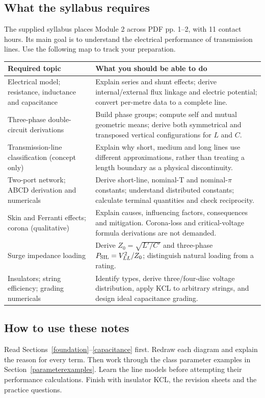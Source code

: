 \documentclass[11pt,a4paper]{article}
\begin{document}
\subsection{What the syllabus requires}
The supplied syllabus places Module 2 across PDF pp. 1--2, with 11 contact hours. Its main goal is to understand the electrical performance of transmission lines. Use the following map to track your preparation.
\begin{center}\small
\begin{tabularx}{\textwidth}{L{5.8cm}Y}
\toprule\textbf{Required topic} & \textbf{What you should be able to do}\\\midrule
Electrical model; resistance, inductance and capacitance & Explain series and shunt effects; derive internal/external flux linkage and electric potential; convert per-metre data to a complete line.\\
Three-phase double-circuit derivations & Build phase groups; compute self and mutual geometric means; derive both symmetrical and transposed vertical configurations for $L$ and $C$.\\
Transmission-line classification (concept only) & Explain why short, medium and long lines use different approximations, rather than treating a length boundary as a physical discontinuity.\\
Two-port network; ABCD derivation and numericals & Derive short-line, nominal-T and nominal-$\pi$ constants; understand distributed constants; calculate terminal quantities and check reciprocity.\\
Skin and Ferranti effects; corona (qualitative) & Explain causes, influencing factors, consequences and mitigation. Corona-loss and critical-voltage formula derivations are not demanded.\\
Surge impedance loading & Derive $Z_0=\sqrt{L'/C'}$ and three-phase $P_{\rm SIL}=V_{LL}^2/Z_0$; distinguish natural loading from a rating.\\
Insulators; string efficiency; grading numericals & Identify types, derive three/four-disc voltage distribution, apply KCL to arbitrary strings, and design ideal capacitance grading.\\\bottomrule
\end{tabularx}\end{center}
\subsection{How to use these notes}
Read Sections~\ref{foundation}--\ref{capacitance} first. Redraw each diagram and explain the reason for every term. Then work through the class parameter examples in Section~\ref{parameterexamples}. Learn the line models before attempting their performance calculations. Finish with insulator KCL, the revision sheets and the practice questions.
\end{document}
